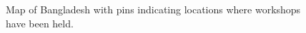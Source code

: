 \documentclass[12pt]{report} %
\begin{document}

\begin{figure}[!htb] %
\caption{Map of Bangladesh with pins indicating locations where workshops have been held.}
\label{fig:map}
\end{figure}

\end{document}
